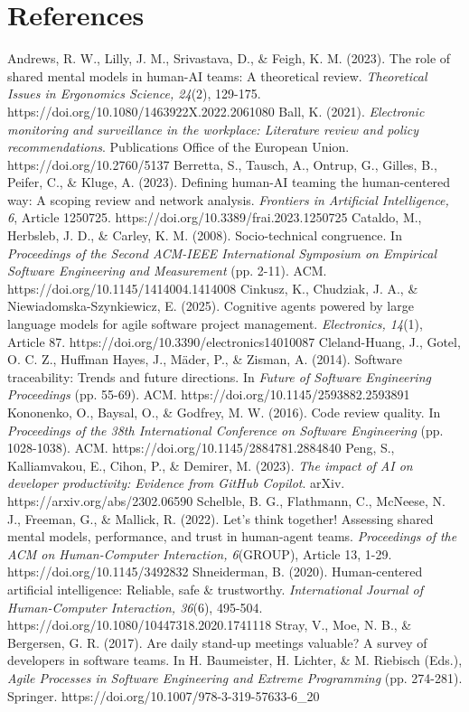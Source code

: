 \documentclass[11pt]{article}
\begin{document}
\section{References}
Andrews, R. W., Lilly, J. M., Srivastava, D., \& Feigh, K. M. (2023). The role of shared mental models in human-AI teams: A theoretical review. \emph{Theoretical Issues in Ergonomics Science, 24}(2), 129-175. https://doi.org/10.1080/1463922X.2022.2061080
Ball, K. (2021). \emph{Electronic monitoring and surveillance in the workplace: Literature review and policy recommendations}. Publications Office of the European Union. https://doi.org/10.2760/5137
Berretta, S., Tausch, A., Ontrup, G., Gilles, B., Peifer, C., \& Kluge, A. (2023). Defining human-AI teaming the human-centered way: A scoping review and network analysis. \emph{Frontiers in Artificial Intelligence, 6}, Article 1250725. https://doi.org/10.3389/frai.2023.1250725
Cataldo, M., Herbsleb, J. D., \& Carley, K. M. (2008). Socio-technical congruence. In \emph{Proceedings of the Second ACM-IEEE International Symposium on Empirical Software Engineering and Measurement} (pp. 2-11). ACM. https://doi.org/10.1145/1414004.1414008
Cinkusz, K., Chudziak, J. A., \& Niewiadomska-Szynkiewicz, E. (2025). Cognitive agents powered by large language models for agile software project management. \emph{Electronics, 14}(1), Article 87. https://doi.org/10.3390/electronics14010087
Cleland-Huang, J., Gotel, O. C. Z., Huffman Hayes, J., Mäder, P., \& Zisman, A. (2014). Software traceability: Trends and future directions. In \emph{Future of Software Engineering Proceedings} (pp. 55-69). ACM. https://doi.org/10.1145/2593882.2593891
Kononenko, O., Baysal, O., \& Godfrey, M. W. (2016). Code review quality. In \emph{Proceedings of the 38th International Conference on Software Engineering} (pp. 1028-1038). ACM. https://doi.org/10.1145/2884781.2884840
Peng, S., Kalliamvakou, E., Cihon, P., \& Demirer, M. (2023). \emph{The impact of AI on developer productivity: Evidence from GitHub Copilot}. arXiv. https://arxiv.org/abs/2302.06590
Schelble, B. G., Flathmann, C., McNeese, N. J., Freeman, G., \& Mallick, R. (2022). Let's think together! Assessing shared mental models, performance, and trust in human-agent teams. \emph{Proceedings of the ACM on Human-Computer Interaction, 6}(GROUP), Article 13, 1-29. https://doi.org/10.1145/3492832
Shneiderman, B. (2020). Human-centered artificial intelligence: Reliable, safe \& trustworthy. \emph{International Journal of Human-Computer Interaction, 36}(6), 495-504. https://doi.org/10.1080/10447318.2020.1741118
Stray, V., Moe, N. B., \& Bergersen, G. R. (2017). Are daily stand-up meetings valuable? A survey of developers in software teams. In H. Baumeister, H. Lichter, \& M. Riebisch (Eds.), \emph{Agile Processes in Software Engineering and Extreme Programming} (pp. 274-281). Springer. https://doi.org/10.1007/978-3-319-57633-6\_20
\end{document}
